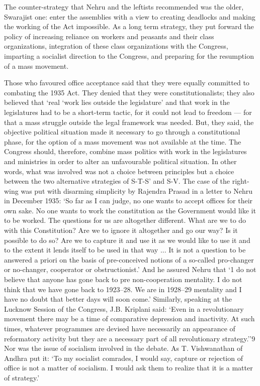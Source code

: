 \begin{multicols}{2}
The counter-strategy that Nehru and the leftists recommended was the older, Swarajist one: enter the assemblies with a view to creating deadlocks and making the working of the Act impossible. As a long term strategy, they put forward the policy of increasing reliance on workers and peasants and their class organizations, integration of these class organizations with the Congress, imparting a socialist direction to the Congress, and preparing for the resumption of a mass movement. 

Those who favoured office acceptance said that they were equally committed to combating the 1935 Act. They denied that they were constitutionalists; they also believed that `real `work lies outside the legislature' and that work in the legislatures had to be a short-term tactic, for it could not lead to freedom --- for that a mass struggle outside the legal framework was needed. But, they said, the objective political situation made it necessary to go through a constitutional phase, for the option of a mass movement was not available at the time. The Congress should, therefore, combine mass politics with work in the legislatures and ministries in order to alter an unfavourable political situation. In other words, what was involved was not a choice between principles but a choice between the two alternative strategies of S-T-S' and S-V. The case of the right-wing was put with disarming simplicity by Rajendra Prasad in a letter to Nehru in December 1935: `So far as I can judge, no one wants to accept offices for their own sake. No one wants to work the constitution as the Government would like it to be worked. The questions for us are altogether different. What are we to do with this Constitution? Are we to ignore it altogether and go our way? Is it possible to do so? Are we to capture it and use it as we would like to use it and to the extent it lends itself to be used in that way ... It is not a question to be answered a priori on the basis of pre-conceived notions of a so-called pro-changer or no-changer, cooperator or obstructionist.' And he assured Nehru that `1 do not believe that anyone has gone back to pre non-cooperation mentality. I do not think that we have gone back to 1923--28. We are in 1928--29 mentality and I have no doubt that better days will soon come.' Similarly, speaking at the Lucknow Session of the Congress, J.B. Kriplani said: `Even in a revolutionary movement there may be a time of comparative depression and inactivity. At such times, whatever programmes are devised have necessarily an appearance of reformatory activity but they are a necessary part of all revolutionary strategy.''9 Nor was the issue of socialism involved in the debate. As T. Vishwanathan of Andhra put it: `To my socialist comrades, I would say, capture or rejection of office is not a matter of socialism. I would ask them to realize that it is a matter of strategy.' 


\end{multicols}
